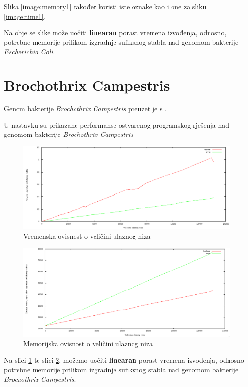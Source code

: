 \documentclass[times, utf8, seminar, numeric]{fer}
\begin{document}
Slika \ref{image:memory1} također koristi iste oznake kao i one za sliku \ref{image:time1}. 

Na obje se slike može uočiti \textbf{linearan} porast vremena izvođenja, odnosno, potrebne memorije prilikom izgradnje sufiksnog stabla nad genomom bakterije \textit{Escherichia Coli}.


\section{Brochothrix Campestris}
	Genom bakterije \textit{Brochothrix Campestris} preuzet je s \cite{klamidija}. 
	
	U nastavku su prikazane performanse ostvarenog programskog rješenja nad genomom bakterije \textit{Brochothrix Campestris}.

\begin{figure}[h!]	
	\centering
	\includegraphics[width=1\textwidth]{media/time_2.png}
	\caption{Vremenska ovisnost o veličini ulaznog niza}
	\label{image:time2}
\end{figure}

\begin{figure}[h!]	
	\centering
	\includegraphics[width=1\textwidth]{media/memory_2.png}
	\caption{Memorijska ovisnost o veličini ulaznog niza}
	\label{image:memory2}
\end{figure}

\pagebreak

Na slici \ref{image:time2} te slici \ref{image:memory2}, možemo uočiti \textbf{linearan} porast vremena izvođenja, odnosno potrebne memorije prilikom izgradnje sufiksnog stabla nad genomom bakterije \textit{Brochothrix Campestris}.
\end{document}
